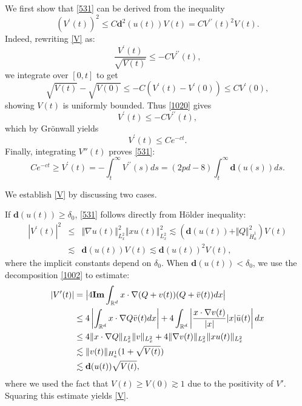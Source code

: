 \documentclass[12pt]{amsart}
\begin{document}
We first show that \eqref{531} can be derived from the inequality 
\begin{equation}
(V^{\prime }(t))^{2}\leq C\mathbf{d}^{2}(u(t))V(t)=CV^{\prime \prime
}(t)^{2}V(t). \label{V}
\end{equation}%
 Indeed, rewriting \eqref{V} as:
\begin{equation}\label{1020}
\frac{V^{\prime }(t)}{\sqrt{V(t)}}\leq -CV^{\prime \prime }(t),
\end{equation}%
we integrate over $[0,t]$ to get%
\begin{equation*}
\sqrt{V(t)}-\sqrt{V(0)}\leq -C(V^{\prime }(t)-V^{\prime }(0))\leq CV^{\prime
}(0),
\end{equation*}%
showing $V(t)$ is uniformly bounded. Thus \eqref{1020} gives
\begin{equation*}
V^{\prime }(t)\leq -CV^{\prime \prime }(t), 
\end{equation*}%
which by Gr\"onwall yields
\[
V^{\prime }(t)\leq Ce^{-ct}. 
\]
Finally, integrating $V''(t)$ proves \eqref{531}:
\begin{equation*}
 Ce^{-ct}\ge V^{\prime }(t)=-\int_{t}^{\infty }V^{\prime \prime
}(s)ds=(2pd-8)\int_{t}^{\infty }\mathbf{d}(u(s))ds.
\end{equation*}%


We establish \eqref{V} by discussing two cases.

If $\mathbf{d}(u(t))\geq \delta _{0}$, \eqref{531} follows directly from H\"{o}lder inequality:
\begin{eqnarray*}
|V^{\prime }(t)|^{2} &\leq &\Vert \nabla u(t)\Vert _{L_x^2}^{2}\Vert xu(t)\Vert
_{L_x^2}^{2}\lesssim (\mathbf{d}(u(t))+\Vert Q\Vert _{\dot{H}_{a}^{1}}^{2})V(t)
\\
&\lesssim &\mathbf{d}(u(t))V(t)\lesssim \mathbf{d}(u(t))^{2}V(t),
\end{eqnarray*}%
where the implicit constants 
depend on $\delta _{0}$. 
When $\mathbf{d}%
(u(t))<\delta _{0}$, we use the decomposition \eqref{1002} to estimate:
\begin{align*}
|V^{\prime }(t)|& =\bigl|4\mathbf{Im}\int_{\mathbb{R}^{d}}x\cdot \nabla
(Q+v(t))(Q+\bar{v}(t))dx\bigr| \\
& \leq 4\left\vert \int_{\mathbb{R}^{d}}x\cdot \nabla Q\bar{v}%
(t)dx\right\vert +4\int_{\mathbb{R}^{d}}\left\vert \frac{x\cdot \nabla v(t)}{%
|x|}|x|\bar{u}(t)\right\vert dx \\
& \leq 4\Vert x\cdot \nabla Q\Vert _{L_x^2}\Vert v\Vert _{L_x^2}+4\Vert \nabla
v(t)\Vert _{L_x^2}\Vert xu(t)\Vert _{L_x^2}\\
& \lesssim \Vert v(t)\Vert _{H_{a}^{1}}\mathbf{(}1+\sqrt{V(t)}\mathbf{)} \\
& \lesssim \mathbf{d}(u(t))\sqrt{V(t)},
\end{align*}%
where we used the fact that $V(t)\geq V(0)\gtrsim 1$ due to the positivity of $V'$. Squaring this estimate yields \eqref{V}.
\end{document}
